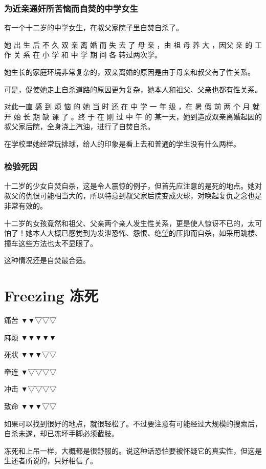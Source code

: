 \documentclass[UTF8]{ctexart}
\begin{document}
\subsubsection*{为近亲通奸所苦恼而自焚的中学女生}

有一个十二岁的中学女生，在叔父家院子里自焚自杀了。

她 出 生 后 不 久 双 亲 离 婚 而 失 去 了 母 亲 ，由 祖 母 养 大 ，因父 亲 的 工 作 关 系 在 小 学 和 中 学 期 间 各 转过两次学。

她生长的家庭环境非常复杂的，双亲离婚的原因是由于母亲和叔父有了性关系。
 
可是，促使她走上自杀道路的原因更为复杂，她本人和祖父、父亲也都有性关系。

对此一直 感 到 烦 恼 的 她 当 时 还 在 中 学 一 年 级 ，在 暑 假 前 两 个 月 就 开 始 长 期 缺 课 了 。终 于 在 刚 过 中 午 的 某一天，她到造成双亲离婚起因的叔父家后院，全身浇上汽油，进行了自焚自杀。

在学校里她经常玩排球，给人的印象是看上去和普通的学生没有什么两样。

\subsubsection*{检验死因}

十二岁的少女自焚自杀，这是令人震惊的例子，但首先应注意的是死的地点。她对叔父的仇恨可能相当大的，所以特意到叔父家后院变成火球，对唤起复仇之念也是非常有效的。

十二岁的女孩竟然和祖父、父亲两个亲人发生性关系，更是使人惊讶不已的，太可怕了！她本人大概已感觉到为发泄恐怖、怨恨、绝望的压抑而自杀，如采用跳楼、撞车这些方法也太不显眼了。

这种情况还是自焚最合适。



\newpage

\section{Freezing 冻死}

痛苦 ▼▼▽▽▽

麻烦 ▼▼▼▼▼

死状 ▼▼▼▽▽

牵连 ▼▽▽▽▽

冲击 ▼▽▽▽▽

致命 ▼▼▼▽▽

如果可以找到很好的地点，就很轻松了。不过要注意有可能经过大规模的搜索后，自杀未遂，却已冻坏手脚必须截肢。

冻死和上吊一样，大概都是很舒服的。说这种话恐怕要被怀疑它的真实性，但这是生还者所说的，只好相信了。
\end{document}
